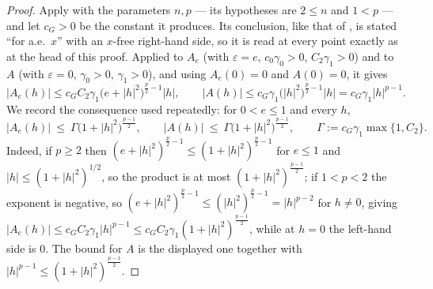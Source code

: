 \begin{proof}
Apply  with the parameters $n,p$ --- its
hypotheses are $2\le n$ and $1<p$ --- and let $c_G>0$ be the constant it
produces.  Its conclusion, like that of , is
stated ``for a.e.\ $x$'' with an $x$-free right-hand side, so it is read at
every point exactly as at the head of this proof.  Applied to $A_e$ (with
$\varepsilon=e$, $c_0\gamma_0>0$, $C_2\gamma_1>0$) and to $A$ (with
$\varepsilon=0$, $\gamma_0>0$, $\gamma_1>0$), and using $A_e(0)=0$ and $A(0)=0$,
it gives
\[
|A_e(h)|\le c_GC_2\gamma_1\bigl(e+|h|^2\bigr)^{\frac p2-1}|h| ,
\qquad
|A(h)|\le c_G\gamma_1\bigl(|h|^2\bigr)^{\frac p2-1}|h|=c_G\gamma_1|h|^{p-1} .
\]
We record the consequence used repeatedly: for $0<e\le1$ and every $h$,
\[
|A_e(h)|\ \le\ \Gamma\bigl(1+|h|^2\bigr)^{\frac{p-1}2},
\qquad
|A(h)|\ \le\ \Gamma\bigl(1+|h|^2\bigr)^{\frac{p-1}2},
\qquad
\Gamma:=c_G\gamma_1\max\{1,C_2\} .
\tag{G}
\]
Indeed, if $p\ge2$ then $(e+|h|^2)^{\frac p2-1}\le(1+|h|^2)^{\frac p2-1}$ for
$e\le1$ and $|h|\le(1+|h|^2)^{1/2}$, so the product is at most
$(1+|h|^2)^{\frac{p-1}2}$; if $1<p<2$ the exponent is negative, so
$(e+|h|^2)^{\frac p2-1}\le(|h|^2)^{\frac p2-1}=|h|^{p-2}$ for $h\ne0$, giving
$|A_e(h)|\le c_GC_2\gamma_1|h|^{p-1}\le c_GC_2\gamma_1(1+|h|^2)^{\frac{p-1}2}$,
while at $h=0$ the left-hand side is $0$.  The bound for $A$ is the displayed one
together with $|h|^{p-1}\le(1+|h|^2)^{\frac{p-1}2}$.


\end{proof}
